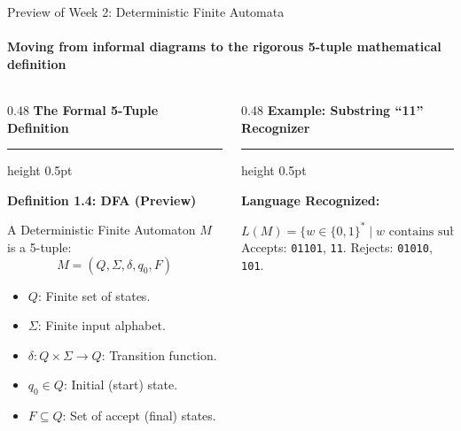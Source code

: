 \documentclass[aspectratio=169, 10pt]{beamer}
\newcommand{\colheader}[1]{%
  {\noindent\footnotesize\bfseries\color{gimpanavy}#1}%
  \vspace{0.02cm}%
  {\color{gimpanavy!30}\hrule height 0.5pt}%
  \vspace{0.05cm}%
}
\newcommand{\cardtitle}[1]{{\noindent\footnotesize\bfseries\color{gimpanavy}#1}\par\vspace{0.03cm}}
\newcommand{\greentitle}[1]{{\noindent\footnotesize\bfseries\color{accentGreen}#1}\par\vspace{0.03cm}}
\begin{document}
\begin{frame}{Preview of Week 2: Deterministic Finite Automata}
  \framesubtitle{Moving from informal diagrams to the rigorous 5-tuple mathematical definition}
  
  \begin{columns}[T]
    \begin{column}{0.48\textwidth}
      \colheader{The Formal 5-Tuple Definition}
      \begin{tcolorbox}[conceptcard]
        \cardtitle{Definition 1.4: DFA (Preview)}
        {\scriptsize
        A Deterministic Finite Automaton $M$ is a 5-tuple:
        \[ M = (Q, \Sigma, \delta, q_0, F) \]
        \begin{itemize}\setlength{\itemsep}{1.5pt}\scriptsize
          \item $Q$: Finite set of states.
          \item $\Sigma$: Finite input alphabet.
          \item $\delta: Q \times \Sigma \to Q$: Transition function.
          \item $q_0 \in Q$: Initial (start) state.
          \item $F \subseteq Q$: Set of accept (final) states.
        \end{itemize}
        }
      \end{tcolorbox}
    \end{column}
    
    \begin{column}{0.48\textwidth}
      \colheader{Example: Substring ``11'' Recognizer}
      \begin{center}
      \end{center}
      \begin{tcolorbox}[examplecard]
        \greentitle{Language Recognized:}
        {\scriptsize
        \[ L(M) = \{w \in \{0, 1\}^* \mid w \text{ contains substring } 11\} \]
        Accepts: \texttt{01101}, \texttt{11}. Rejects: \texttt{01010}, \texttt{101}.
        }
      \end{tcolorbox}
    \end{column}
  \end{columns}
  

\end{frame}
\end{document}
